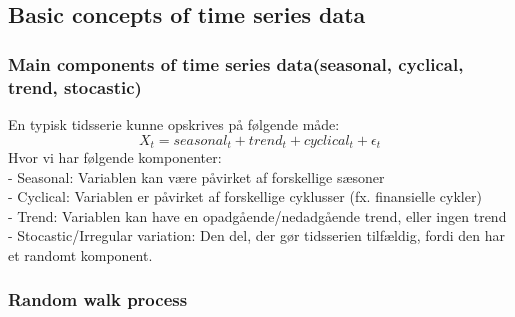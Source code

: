 \documentclass[
  10pt,
]{article}
\begin{document}
\newpage



\hypertarget{basic-concepts-of-time-series-data}{%
\subsection{Basic concepts of time series
data}\label{basic-concepts-of-time-series-data}}

\hypertarget{main-components-of-time-series-dataseasonal-cyclical-trend-stocastic}{%
\subsubsection{\texorpdfstring{Main components of time series
data(seasonal, cyclical, trend, stocastic)\\
}{Main components of time series data(seasonal, cyclical, trend, stocastic) }}\label{main-components-of-time-series-dataseasonal-cyclical-trend-stocastic}}

En typisk tidsserie kunne opskrives på følgende måde:
\[X_t=seasonal_t+trend_t+cyclical_t+\epsilon_t \] Hvor vi har følgende
komponenter:\\
- Seasonal: Variablen kan være påvirket af forskellige sæsoner\\
- Cyclical: Variablen er påvirket af forskellige cyklusser (fx.
finansielle cykler)\\
- Trend: Variablen kan have en opadgående/nedadgående trend, eller ingen
trend\\
- Stocastic/Irregular variation: Den del, der gør tidsserien tilfældig,
fordi den har et randomt komponent.\\

\hypertarget{random-walk-process}{%
\subsubsection{Random walk process}\label{random-walk-process}}
\end{document}
